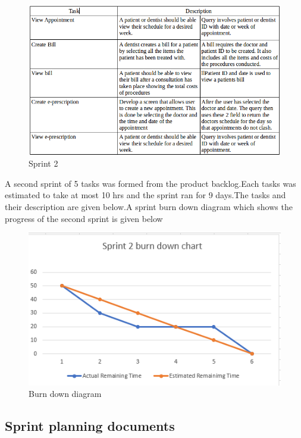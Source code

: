 \documentclass[11 pt]{article}
\begin{document}
\newpage
\begin{figure}[h]
    \centering
    \includegraphics[width=\linewidth]{sprint2.png}
    \caption{Sprint 2}
    \label{fig:ERD}
\end{figure}

A second sprint of 5 tasks was formed from the product backlog.Each tasks was estimated to take at most 10 hrs and the sprint ran for 9 days.The tasks and their description are given below.A sprint burn down diagram which shows the progress of the second sprint is given below 
\begin{figure}[h]
    \centering
    
    \includegraphics[width=\linewidth]{sprint3.PNG}
    \caption{Burn down diagram}
    \label{fig:ERD}
    \end{figure}
    
\subsection{Sprint planning documents}
\end{document}
